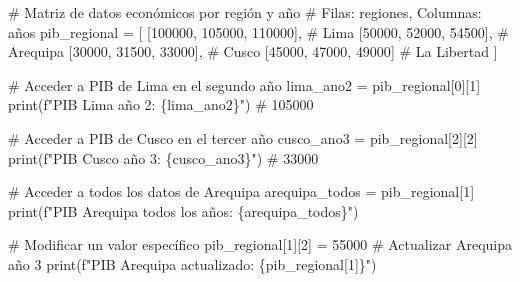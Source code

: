 \documentclass[
  doc,
  floatsintext,
  longtable,
  a4paper,
  nolmodern,
  notxfonts,
  notimes,
  12pt,
  colorlinks=true,linkcolor=blue,citecolor=blue,urlcolor=blue]{apa7}
\newenvironment{Shaded}{\begin{snugshade}}{\end{snugshade}}
\newcommand{\BuiltInTok}[1]{\textcolor[rgb]{0.00,0.23,0.31}{#1}}
\newcommand{\CommentTok}[1]{\textcolor[rgb]{0.37,0.37,0.37}{#1}}
\newcommand{\DecValTok}[1]{\textcolor[rgb]{0.68,0.00,0.00}{#1}}
\newcommand{\NormalTok}[1]{\textcolor[rgb]{0.00,0.23,0.31}{#1}}
\newcommand{\OperatorTok}[1]{\textcolor[rgb]{0.37,0.37,0.37}{#1}}
\newcommand{\SpecialCharTok}[1]{\textcolor[rgb]{0.37,0.37,0.37}{#1}}
\newcommand{\SpecialStringTok}[1]{\textcolor[rgb]{0.13,0.47,0.30}{#1}}
\begin{document}
\begin{Shaded}
\begin{Highlighting}[]
\CommentTok{\# Matriz de datos económicos por región y año}
\CommentTok{\# Filas: regiones, Columnas: años}
\NormalTok{pib\_regional }\OperatorTok{=}\NormalTok{ [}
\NormalTok{    [}\DecValTok{100000}\NormalTok{, }\DecValTok{105000}\NormalTok{, }\DecValTok{110000}\NormalTok{],  }\CommentTok{\# Lima}
\NormalTok{    [}\DecValTok{50000}\NormalTok{, }\DecValTok{52000}\NormalTok{, }\DecValTok{54500}\NormalTok{],     }\CommentTok{\# Arequipa}
\NormalTok{    [}\DecValTok{30000}\NormalTok{, }\DecValTok{31500}\NormalTok{, }\DecValTok{33000}\NormalTok{],     }\CommentTok{\# Cusco}
\NormalTok{    [}\DecValTok{45000}\NormalTok{, }\DecValTok{47000}\NormalTok{, }\DecValTok{49000}\NormalTok{]      }\CommentTok{\# La Libertad}
\NormalTok{]}

\CommentTok{\# Acceder a PIB de Lima en el segundo año}
\NormalTok{lima\_ano2 }\OperatorTok{=}\NormalTok{ pib\_regional[}\DecValTok{0}\NormalTok{][}\DecValTok{1}\NormalTok{]}
\BuiltInTok{print}\NormalTok{(}\SpecialStringTok{f"PIB Lima año 2: }\SpecialCharTok{\{}\NormalTok{lima\_ano2}\SpecialCharTok{\}}\SpecialStringTok{"}\NormalTok{)  }\CommentTok{\# 105000}

\CommentTok{\# Acceder a PIB de Cusco en el tercer año}
\NormalTok{cusco\_ano3 }\OperatorTok{=}\NormalTok{ pib\_regional[}\DecValTok{2}\NormalTok{][}\DecValTok{2}\NormalTok{]}
\BuiltInTok{print}\NormalTok{(}\SpecialStringTok{f"PIB Cusco año 3: }\SpecialCharTok{\{}\NormalTok{cusco\_ano3}\SpecialCharTok{\}}\SpecialStringTok{"}\NormalTok{)  }\CommentTok{\# 33000}

\CommentTok{\# Acceder a todos los datos de Arequipa}
\NormalTok{arequipa\_todos }\OperatorTok{=}\NormalTok{ pib\_regional[}\DecValTok{1}\NormalTok{]}
\BuiltInTok{print}\NormalTok{(}\SpecialStringTok{f"PIB Arequipa todos los años: }\SpecialCharTok{\{}\NormalTok{arequipa\_todos}\SpecialCharTok{\}}\SpecialStringTok{"}\NormalTok{)}

\CommentTok{\# Modificar un valor específico}
\NormalTok{pib\_regional[}\DecValTok{1}\NormalTok{][}\DecValTok{2}\NormalTok{] }\OperatorTok{=} \DecValTok{55000}  \CommentTok{\# Actualizar Arequipa año 3}
\BuiltInTok{print}\NormalTok{(}\SpecialStringTok{f"PIB Arequipa actualizado: }\SpecialCharTok{\{}\NormalTok{pib\_regional[}\DecValTok{1}\NormalTok{]}\SpecialCharTok{\}}\SpecialStringTok{"}\NormalTok{)}
\end{Highlighting}
\end{Shaded}
\end{document}

